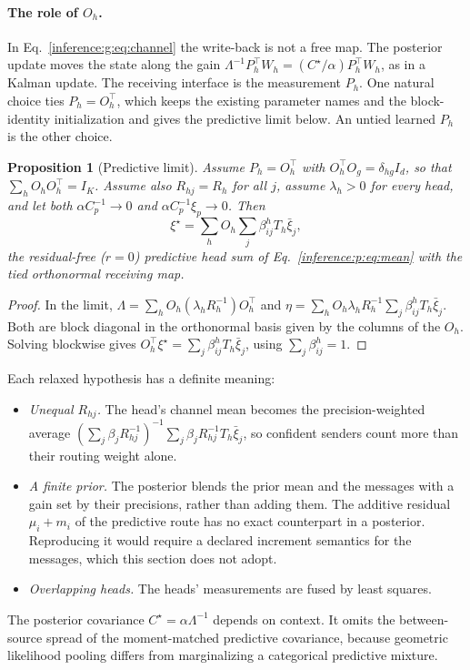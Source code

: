 \documentclass[11pt]{article}
\newtheorem{proposition}[theorem]{Proposition}
\theoremstyle{definition}
\theoremstyle{remark}
\begin{document}
\paragraph{The role of $O_h$.}
In Eq.~\eqref{inference:g:eq:channel} the write-back is not a free map. The posterior update moves the state along the gain $\Lambda^{-1}P_h^\top W_h=(C^\star/\alpha)P_h^\top W_h$, as in a Kalman update. The receiving interface is the measurement $P_h$. One natural choice ties $P_h=O_h^\top$, which keeps the existing parameter names and the block-identity initialization and gives the predictive limit below. An untied learned $P_h$ is the other choice.

\begin{proposition}[Predictive limit]
\label{inference:g:prop:predictive_limit}
Assume $P_h=O_h^\top$ with $O_h^\top O_g=\delta_{hg}I_d$, so that $\sum_hO_hO_h^\top=I_K$. Assume also $R_{hj}=R_h$ for all $j$, assume $\lambda_h>0$ for every head, and let both $\alpha C_p^{-1}\to0$ and $\alpha C_p^{-1}\xi_p\to0$. Then
\begin{equation}
\xi^\star=\sum_hO_h\sum_j\beta_{ij}^hT_h\bar\xi_j,
\end{equation}
the residual-free ($r=0$) predictive head sum of Eq.~\eqref{inference:p:eq:mean} with the tied orthonormal receiving map.
\end{proposition}

\begin{proof}
In the limit, $\Lambda=\sum_hO_h(\lambda_hR_h^{-1})O_h^\top$ and $\eta=\sum_hO_h\lambda_hR_h^{-1}\sum_j\beta_{ij}^hT_h\bar\xi_j$. Both are block diagonal in the orthonormal basis given by the columns of the $O_h$. Solving blockwise gives $O_h^\top\xi^\star=\sum_j\beta_{ij}^hT_h\bar\xi_j$, using $\sum_j\beta_{ij}^h=1$.
\end{proof}

Each relaxed hypothesis has a definite meaning:
\begin{itemize}
\item \emph{Unequal $R_{hj}$.} The head's channel mean becomes the precision-weighted average $(\sum_j\beta_jR_{hj}^{-1})^{-1}\sum_j\beta_jR_{hj}^{-1}T_h\bar\xi_j$, so confident senders count more than their routing weight alone.
\item \emph{A finite prior.} The posterior blends the prior mean and the messages with a gain set by their precisions, rather than adding them. The additive residual $\mu_i+m_i$ of the predictive route has no exact counterpart in a posterior. Reproducing it would require a declared increment semantics for the messages, which this section does not adopt.
\item \emph{Overlapping heads.} The heads' measurements are fused by least squares.
\end{itemize}
The posterior covariance $C^\star=\alpha\Lambda^{-1}$ depends on context. It omits the between-source spread of the moment-matched predictive covariance, because geometric likelihood pooling differs from marginalizing a categorical predictive mixture.
\end{document}
